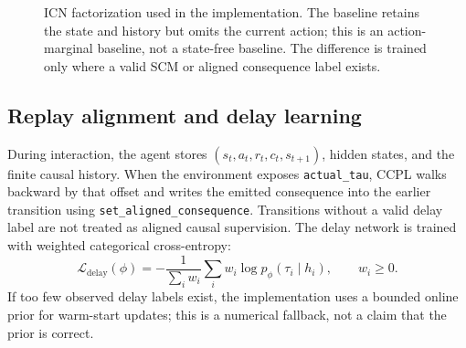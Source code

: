 \documentclass[10pt]{article}
\begin{document}
\begin{figure}[t]
\centering
{}%
\caption{ICN factorization used in the implementation. The baseline retains
the state and history but omits the current action; this is an action-marginal
baseline, not a state-free baseline. The difference is trained only where a
valid SCM or aligned consequence label exists.}
\label{fig:icn}
\end{figure}

\subsection{Replay alignment and delay learning}
During interaction, the agent stores $(s_t,a_t,r_t,c_t,s_{t+1})$, hidden
states, and the finite causal history. When the environment exposes
\texttt{actual\_tau}, CCPL walks backward by that offset and writes the emitted
consequence into the earlier transition using
\texttt{set\_aligned\_consequence}.
Transitions without a valid delay label are not treated as aligned causal
supervision. The delay network is trained with weighted categorical
cross-entropy:
\begin{equation}
\mathcal{L}_{\mathrm{delay}}(\phi)=
-\frac{1}{\sum_i w_i}\sum_iw_i\log p_\phi(\tau_i\mid h_i),
\qquad w_i\ge0.
\end{equation}
If too few observed delay labels exist, the implementation uses a bounded
online prior for warm-start updates; this is a numerical fallback, not a
claim that the prior is correct.
\end{document}
